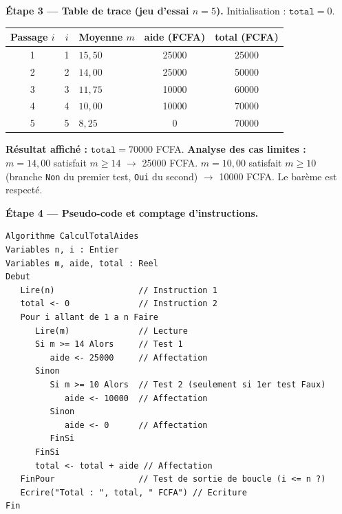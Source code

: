 \documentclass[11pt]{article}
\begin{document}
\begin{exoresolu}
\textbf{Étape 3 — Table de trace (jeu d'essai $n=5$).}
Initialisation : $\texttt{total} = 0$.

\begin{center}
\begin{tabularx}{\linewidth}{|c|c|X|c|c|}
\hline
\rowcolor{popblueL} \textbf{Passage $i$} & \textbf{$i$} & \textbf{Moyenne $m$} & \textbf{aide (FCFA)} & \textbf{total (FCFA)} \\
\hline
1 & 1 & $15{,}50$ & \num{25000} & \num{25000} \\
\hline
2 & 2 & $14{,}00$ & \num{25000} & \num{50000} \\
\hline
3 & 3 & $11{,}75$ & \num{10000} & \num{60000} \\
\hline
4 & 4 & $10{,}00$ & \num{10000} & \num{70000} \\
\hline
5 & 5 & $8{,}25$ & $0$ & \num{70000} \\
\hline
\end{tabularx}
\end{center}

\textbf{Résultat affiché :} $\texttt{total} = \num{70000}$ FCFA.
\textbf{Analyse des cas limites :} $m = 14{,}00$ satisfait $m \geq 14$ $\rightarrow$ \num{25000} FCFA. $m = 10{,}00$ satisfait $m \geq 10$ (branche \texttt{Non} du premier test, \texttt{Oui} du second) $\rightarrow$ \num{10000} FCFA. Le barème est respecté.

\textbf{Étape 4 — Pseudo-code et comptage d'instructions.}

\begin{lstlisting}
Algorithme CalculTotalAides
Variables n, i : Entier
Variables m, aide, total : Reel
Debut
   Lire(n)                 // Instruction 1
   total <- 0              // Instruction 2
   Pour i allant de 1 a n Faire
      Lire(m)              // Lecture
      Si m >= 14 Alors     // Test 1
         aide <- 25000     // Affectation
      Sinon
         Si m >= 10 Alors  // Test 2 (seulement si 1er test Faux)
            aide <- 10000  // Affectation
         Sinon
            aide <- 0      // Affectation
         FinSi
      FinSi
      total <- total + aide // Affectation
   FinPour                 // Test de sortie de boucle (i <= n ?)
   Ecrire("Total : ", total, " FCFA") // Ecriture
Fin
\end{lstlisting}


\end{exoresolu}
\end{document}
